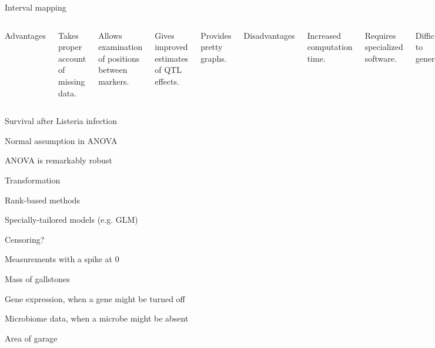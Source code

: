\documentclass[aspectratio=169,12pt,t]{beamer}
\begin{document}
\begin{frame}{Interval mapping}

\begin{columns}


{\hilit Advantages}

\bi
\item Takes proper account of missing data.
\item Allows examination of positions between markers.
\item Gives improved estimates of QTL effects.
\item Provides pretty graphs.
\ei



{\hilit Disadvantages}

\bi
\item Increased computation time.
\item Requires specialized software.
\item Difficult to generalize.
\item {\vhilit Only considers one QTL at a time.}
\ei


\end{columns}

\end{frame}




\begin{frame}[c]{Survival after Listeria infection}
\end{frame}


\begin{frame}{Normal assumption in ANOVA}

  \bbi
\item ANOVA is remarkably robust
\item Transformation
\item Rank-based methods
\item Specially-tailored models (e.g. GLM)
  \ei

\end{frame}




\begin{frame}[c]{}

\centerline{\Large \color{title} Censoring?}

\end{frame}


\begin{frame}{Measurements with a spike at 0}

\bbi
\item Mass of gallstones

\item Gene expression, when a gene might be turned off

\item Microbiome data, when a microbe might be absent

\item Area of garage
\ei

\end{frame}
\end{document}
